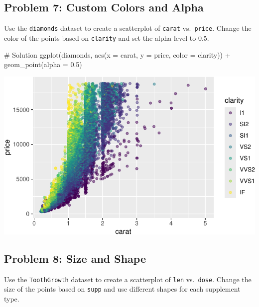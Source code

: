 \documentclass[
  letterpaper,
  DIV=11,
  numbers=noendperiod]{scrreprt}
\newenvironment{Shaded}{\begin{snugshade}}{\end{snugshade}}
\newcommand{\AttributeTok}[1]{\textcolor[rgb]{0.40,0.45,0.13}{#1}}
\newcommand{\CommentTok}[1]{\textcolor[rgb]{0.37,0.37,0.37}{#1}}
\newcommand{\FloatTok}[1]{\textcolor[rgb]{0.68,0.00,0.00}{#1}}
\newcommand{\FunctionTok}[1]{\textcolor[rgb]{0.28,0.35,0.67}{#1}}
\newcommand{\NormalTok}[1]{\textcolor[rgb]{0.00,0.23,0.31}{#1}}
\newcommand{\SpecialCharTok}[1]{\textcolor[rgb]{0.37,0.37,0.37}{#1}}
\begin{document}
\subsection*{Problem 7: Custom Colors and
Alpha}\label{problem-7-custom-colors-and-alpha}

Use the \texttt{diamonds} dataset to create a scatterplot of
\texttt{carat} vs.~\texttt{price}. Change the color of the points based
on \texttt{clarity} and set the alpha level to 0.5.

\begin{Shaded}
\begin{Highlighting}[]
\CommentTok{\# Solution}
\FunctionTok{ggplot}\NormalTok{(diamonds, }\FunctionTok{aes}\NormalTok{(}\AttributeTok{x =}\NormalTok{ carat, }\AttributeTok{y =}\NormalTok{ price, }\AttributeTok{color =}\NormalTok{ clarity)) }\SpecialCharTok{+}
  \FunctionTok{geom\_point}\NormalTok{(}\AttributeTok{alpha =} \FloatTok{0.5}\NormalTok{)}
\end{Highlighting}
\end{Shaded}

\includegraphics{Advanced_Scatterplot_Techniques_files/figure-pdf/unnamed-chunk-26-1.pdf}

\subsection*{Problem 8: Size and Shape}\label{problem-8-size-and-shape}

Use the \texttt{ToothGrowth} dataset to create a scatterplot of
\texttt{len} vs.~\texttt{dose}. Change the size of the points based on
\texttt{supp} and use different shapes for each supplement type.
\end{document}
